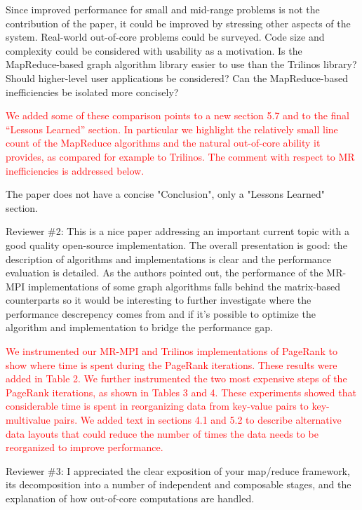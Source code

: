 \documentclass[11pt]{article}
\newcommand{\revise}[1]{\textcolor{red}{#1}}
\begin{document}
Since improved performance for small and mid-range problems is not the
contribution of the paper, it could be improved by stressing other
aspects of the system.  Real-world out-of-core problems could be
surveyed.  Code size and complexity could be considered with usability
as a motivation.  Is the MapReduce-based graph algorithm library
easier to use than the Trilinos library?  Should higher-level user
applications be considered?  Can the MapReduce-based inefficiencies be
isolated more concisely?

\revise{We added some of these comparison points to a new section 5.7
  and to the final ``Lessons Learned'' section.  In particular we
  highlight the relatively small line count of the MapReduce
  algorithms and the natural out-of-core ability it provides, as
  compared for example to Trilinos.  The comment with respect to MR
  inefficiencies is addressed below.}

The paper does not have a concise "Conclusion", only a "Lessons Learned"
section.

\vspace{0.5 in}

Reviewer \#2: This is a nice paper addressing an important current topic
with a good quality open-source implementation.  The overall presentation
is good: the description of algorithms and implementations is clear and the
performance evaluation is detailed. As the authors pointed out, the
performance of the MR-MPI implementations of some graph algorithms falls
behind the matrix-based counterparts so it would be interesting to further
investigate where the performance descrepency comes from and if it's
possible to optimize the algorithm and implementation to bridge the
performance gap.

\revise{We instrumented our MR-MPI and Trilinos implementations of
PageRank to show where time is spent during the PageRank iterations.
These results were added in Table 2.  We further instrumented the two
most expensive steps of the PageRank iterations, as shown in Tables 3
and 4.  These experiments showed that considerable time is spent in
reorganizing data from key-value pairs to key-multivalue pairs.  We
added text in sections 4.1 and 5.2 to describe alternative data
layouts that could reduce the number of times the data needs to be
reorganized to improve performance.}

\vspace{0.5 in}

Reviewer \#3: I appreciated the clear exposition of your map/reduce
framework, its decomposition into a number of independent and composable
stages, and the explanation of how out-of-core computations are handled.
\end{document}
